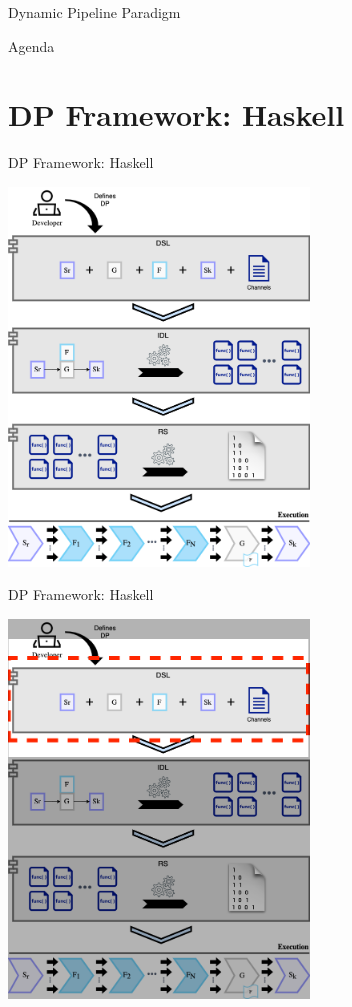 \documentclass{beamer}
\begin{document}
  \begin{frame}[fragile]{Dynamic Pipeline Paradigm}
    
    
  \end{frame}   

  \begin{frame}{Agenda}
    \section{DP Framework: Haskell}
    \tableofcontents[currentsection]
  \end{frame}

  \begin{frame}[fragile]{DP Framework: Haskell}
    \begin{center}
      \includegraphics[width = 0.6\textwidth, height = 0.8\textheight]{dpf_haskell_v3}
    \end{center}
  \end{frame}
  
  \begin{frame}[fragile]{DP Framework: Haskell}
    \begin{center}
      \includegraphics[width = 0.6\textwidth, height = 0.8\textheight]{dpf_haskell_v3-1}
    \end{center}
  \end{frame}
\end{document}
